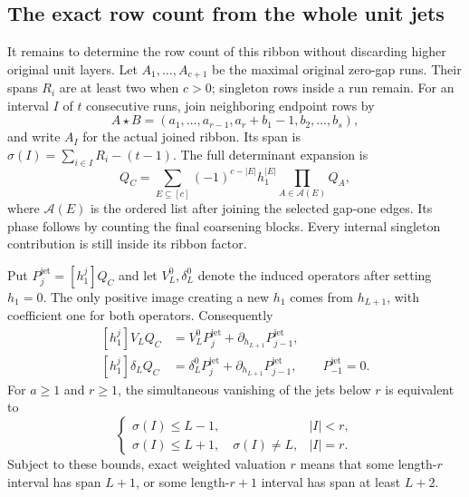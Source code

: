 \documentclass[11pt,a4paper]{amsart}
\numberwithin{equation}{section}
\theoremstyle{plain}
\theoremstyle{definition}
\begin{document}
\subsection{The exact row count from the whole unit jets}

It remains to determine the row count of this ribbon without discarding
higher original unit layers.  Let \(A_1,\ldots,A_{c+1}\) be the maximal
original zero-gap runs.  Their spans \(R_i\) are at least two when \(c>0\);
singleton rows inside a run remain.  For an interval \(I\) of \(t\) consecutive
runs, join neighboring endpoint rows by
\[
 A\star B=(a_1,\ldots,a_{r-1},a_r+b_1-1,b_2,\ldots,b_s),
\]
and write \(A_I\) for the actual joined ribbon.  Its span is
\(\sigma(I)=\sum_{i\in I}R_i-(t-1)\).
The full determinant expansion is
\[
 Q_C=\sum_{E\subseteq[c]}(-1)^{c-|E|}h_1^{|E|}
                         \prod_{A\in\mathcal A(E)}Q_A,
\]
where \(\mathcal A(E)\) is the ordered list after joining the selected
gap-one edges.  Its phase follows by counting the final coarsening blocks.
Every internal singleton contribution is still inside its ribbon factor.

Put \(P^{\mathrm{jet}}_j=[h_1^j]Q_C\) and let \(V_L^0,\delta_L^0\) denote the induced
operators after setting \(h_1=0\).  The only positive image creating a new
\(h_1\) comes from \(h_{L+1}\), with coefficient one for both operators.
Consequently
\begin{equation}\label{eq:whole-h1-jets}
 \begin{aligned}
 [h_1^j]V_LQ_C&=V_L^0P^{\mathrm{jet}}_j+\partial_{h_{L+1}}P^{\mathrm{jet}}_{j-1},\\
 [h_1^j]\delta_LQ_C&=\delta_L^0P^{\mathrm{jet}}_j+
                                      \partial_{h_{L+1}}P^{\mathrm{jet}}_{j-1},
 \qquad P^{\mathrm{jet}}_{-1}=0.
 \end{aligned}
\end{equation}
For \(a\ge1\) and \(r\ge1\), the simultaneous vanishing of the jets below
\(r\) is equivalent to
\begin{equation}\label{eq:run-barriers}
 \begin{cases}
 \sigma(I)\le L-1,&|I|<r,\\
 \sigma(I)\le L+1,\quad \sigma(I)\ne L,&|I|=r.
 \end{cases}
\end{equation}
Subject to these bounds, exact weighted valuation \(r\) means that some
length-\(r\) interval has span \(L+1\), or some length-\(r+1\) interval has span
at least \(L+2\).
\end{document}
